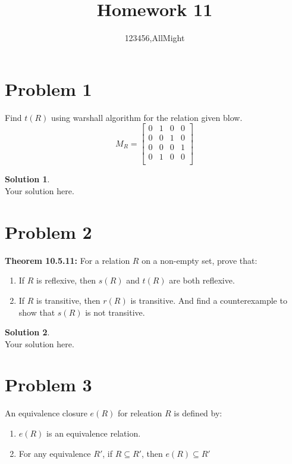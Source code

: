 \documentclass[a4paper,UTF8]{article}
\theoremstyle{definition}
\newtheorem*{solution}{Solution}
\begin{document}
\title{Homework 11}
\author{123456,AllMight}
\maketitle

\section*{Problem 1}
Find $t(R)$ using warshall algorithm for the relation given blow.
$$M_R=\left[\begin{array}{cccc} 
0 & 1 & 0 & 0 \\ 
0 & 0 & 1 & 0 \\ 
0 & 0 & 0 & 1 \\
0 & 1 & 0 & 0 \\
\end{array}\right]
$$
\begin{solution}
	~\\
	Your solution here.
\end{solution}




\section*{Problem 2}
\textbf{Theorem 10.5.11: }For a relation $R$ on a non-empty set, prove that:
\begin{enumerate}
	\item If $R$ is reflexive, then $s(R)$ and $t(R)$ are both reflexive.
	\item If $R$ is transitive, then $r(R)$ is transitive. And find a counterexample to show that $s(R)$ is not transitive.
\end{enumerate}
\begin{solution}
	~\\
	Your solution here.
\end{solution}



\section*{Problem 3}
An equivalence closure $e(R)$ for releation $R$ is defined by:
\begin{enumerate}
	\item $e(R)$ is an equivalence relation.
	\item For any equivalence $R'$, if $R\subseteq R'$, then $e(R)\subseteq R'$
\end{enumerate} 
\end{document}
